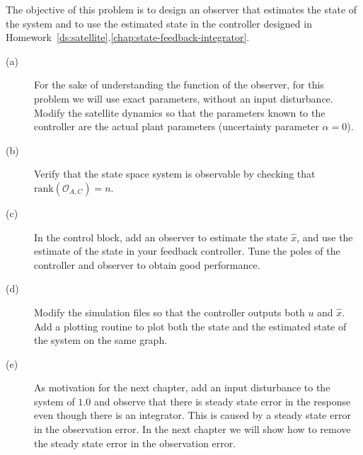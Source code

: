 
The objective of this problem is to design an observer that estimates the state of the system and to use the estimated state in the controller designed in Homework~\ref{ds:satellite}.\ref{chap:state-feedback-integrator}.
\begin{description}\item[]
\item[(a)] For the sake of understanding the function of the observer, for this problem we will use exact parameters, without an input disturbance.  Modify the satellite dynamics so that the parameters known to the controller are the actual plant parameters (uncertainty parameter $\alpha=0$).
\item[(b)] Verify that the state space system is observable by checking that $\text{rank}(\mathcal{O}_{A,C})=n$.
\item[(c)] In the control block, add an observer to estimate the state $\hat{x}$, and use the estimate of the state in your feedback controller. Tune the poles of the controller and observer to obtain good performance.  
\item[(d)] Modify the simulation files so that the controller outputs both $u$ and $\hat{x}$.  Add a plotting routine to plot both the state and the estimated state of the system on the same graph.
\item[(e)] As motivation for the next chapter, add an input disturbance to the system of $1.0$ and observe that there is steady state error in the response even though there is an integrator.  This is caused by a steady state error in the observation error.  In the next chapter we will show how to remove the steady state error in the observation error.
\end{description}


